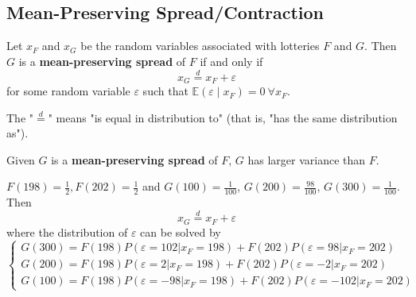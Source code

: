 \documentclass[11pt]{elegantbook}
\begin{document}
\subsection{Mean-Preserving Spread/Contraction}
\begin{definition}
    \normalfont
    Let $x_F$ and $x_G$ be the random variables associated with lotteries $F$ and $G$. Then $G$ is a \textbf{mean-preserving spread} of $F$ if and only if $$x_G \stackrel{d}{=} x_F+\varepsilon$$
    for some random variable $\varepsilon$ such that $\mathbb{E}(\varepsilon\mid x_F)=0\ \forall x_F$.
\end{definition}
The "$\stackrel{d}{=}$" means "is equal in distribution to" (that is, "has the same distribution as").

\begin{note}
    Given $G$ is a \textbf{mean-preserving spread} of $F$, $G$ has larger variance than $F$.
\end{note}

\begin{example}
    $F(198)=\frac{1}{2}, F(202)=\frac{1}{2}$ and $G(100)=\frac{1}{100}$, $G(200)=\frac{98}{100}$, $G(300)=\frac{1}{100}$. Then $$x_G \stackrel{d}{=} x_F+\varepsilon$$
    where the distribution of $\varepsilon$ can be solved by $$\left\{\begin{matrix}
        G(300)=F(198)P(\varepsilon=102|x_F=198)+F(202)P(\varepsilon=98|x_F=202)\\
        G(200)=F(198)P(\varepsilon=2|x_F=198)+F(202)P(\varepsilon=-2|x_F=202)\\
        G(100)=F(198)P(\varepsilon=-98|x_F=198)+F(202)P(\varepsilon=-102|x_F=202)
    \end{matrix}\right.$$
\end{example}
\end{document}
